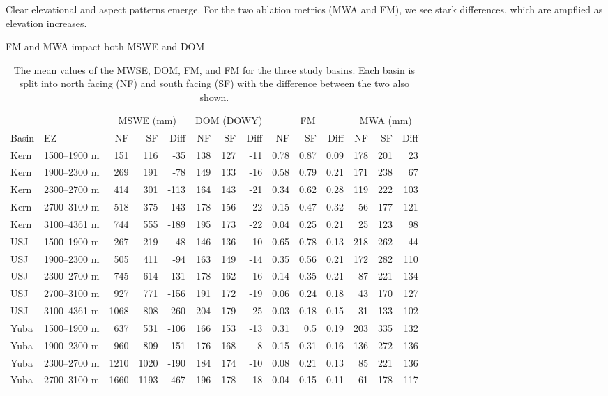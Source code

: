 Clear elevational and aspect patterns emerge. For the two ablation metrics (MWA and FM), we see stark differences, which are ampflied as elevation increases.


FM and MWA impact both MSWE and DOM


\begin{table}[htbp]
\centering
\caption{The mean values of the MWSE, DOM, FM, and FM for the three study basins. Each basin is split into north facing (NF) and south facing (SF) with the difference between the two also shown.}
\label{tab:snow_metric_table}
\tiny %
\begin{tabular}{llrrrrrrrrrrrr}
\toprule
& & \multicolumn{3}{c}{MSWE (mm)} & \multicolumn{3}{c}{DOM (DOWY)} & \multicolumn{3}{c}{FM} & \multicolumn{3}{c}{MWA (mm)} \\
\cmidrule(c){3-5} \cmidrule(lr){6-8} \cmidrule(lr){9-11} \cmidrule(lr){12-14} 
Basin & EZ & NF & SF & Diff & NF & SF & Diff & NF & SF & Diff & NF & SF & Diff \\
\midrule
Kern & 1500--1900 m & 151 & 116 & -35 & 138 & 127 & -11 & 0.78 & 0.87 & 0.09 & 178 & 201 & 23 \\
Kern & 1900--2300 m & 269 & 191 & -78 & 149 & 133 & -16 & 0.58 & 0.79 & 0.21 & 171 & 238 & 67 \\
Kern & 2300--2700 m & 414 & 301 & -113 & 164 & 143 & -21 & 0.34 & 0.62 & 0.28 & 119 & 222 & 103 \\
Kern & 2700--3100 m & 518 & 375 & -143 & 178 & 156 & -22 & 0.15 & 0.47 & 0.32 & 56 & 177 & 121 \\
Kern & 3100--4361 m & 744 & 555 & -189 & 195 & 173 & -22 & 0.04 & 0.25 & 0.21 & 25 & 123 & 98 \\
USJ & 1500--1900 m & 267 & 219 & -48 & 146 & 136 & -10 & 0.65 & 0.78 & 0.13 & 218 & 262 & 44 \\
USJ & 1900--2300 m & 505 & 411 & -94 & 163 & 149 & -14 & 0.35 & 0.56 & 0.21 & 172 & 282 & 110 \\
USJ & 2300--2700 m & 745 & 614 & -131 & 178 & 162 & -16 & 0.14 & 0.35 & 0.21 & 87 & 221 & 134 \\
USJ & 2700--3100 m & 927 & 771 & -156 & 191 & 172 & -19 & 0.06 & 0.24 & 0.18 & 43 & 170 & 127 \\
USJ & 3100--4361 m & 1068 & 808 & -260 & 204 & 179 & -25 & 0.03 & 0.18 & 0.15 & 31 & 133 & 102 \\
Yuba & 1500--1900 m & 637 & 531 & -106 & 166 & 153 & -13 & 0.31 & 0.5 & 0.19 & 203 & 335 & 132 \\
Yuba & 1900--2300 m & 960 & 809 & -151 & 176 & 168 & -8 & 0.15 & 0.31 & 0.16 & 136 & 272 & 136 \\
Yuba & 2300--2700 m & 1210 & 1020 & -190 & 184 & 174 & -10 & 0.08 & 0.21 & 0.13 & 85 & 221 & 136 \\
Yuba & 2700--3100 m & 1660 & 1193 & -467 & 196 & 178 & -18 & 0.04 & 0.15 & 0.11 & 61 & 178 & 117 \\
\bottomrule
\end{tabular}
\end{table}

